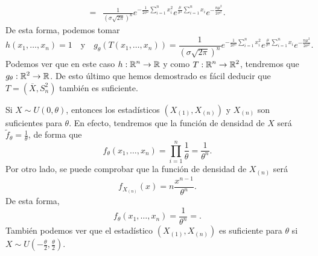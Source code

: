 \begin{eg}[Normal]
\[\begin{split}
	= & \frac{1}{\left(\sigma\sqrt{2\pi }\right)^{n}} e^{-\frac{1}{2\sigma^{2}}\sum^{n}_{i=1}x_{i}^{2}}e^{\frac{\mu}{\sigma^{2}}\sum^{n}_{i=1}x_{i}}e^{-\frac{n\mu^{2}}{2\sigma^{2}}}.
\end{split}
\]
De esta forma, podemos tomar
\[h\left(x_{1}, \ldots, x_{n}\right)=1 \quad \text{y} \quad g_{\theta}\left(T\left(x_{1}, \ldots, x_{n}\right)\right)=\frac{1}{\left(\sigma\sqrt{2\pi }\right)^{n}} e^{-\frac{1}{2\sigma^{2}}\sum^{n}_{i=1}x_{i}^{2}}e^{\frac{\mu}{\sigma^{2}}\sum^{n}_{i=1}x_{i}}e^{-\frac{n\mu^{2}}{2\sigma^{2}}} .\]
Podemos ver que en este caso $\displaystyle h : \mathbb{R}^{n} \to \mathbb{R} $ y como $\displaystyle T : \mathbb{R}^{n} \to \mathbb{R}^{2} $, tendremos que $\displaystyle g_{\theta} : \mathbb{R}^{2} \to \mathbb{R} $. De esto último que hemos demostrado es fácil deducir que $\displaystyle T = \left(\overline{X}, S^{2}_{n}\right) $ también es suficiente. 
\end{eg}
\begin{eg}[Uniforme]
	Si $\displaystyle X \sim U\left(0, \theta\right) $, entonces los estadísticos $\displaystyle \left(X_{\left(1\right)}, X_{\left(n\right)}\right) $ y $\displaystyle X_{\left(n\right)} $ son suficientes para $\displaystyle \theta $. En efecto, tendremos que la función de densidad de $\displaystyle X $ será $\displaystyle \tilde{f}_{\theta}=\frac{1}{\theta} $, de forma que
	\[f_{\theta}\left(x_{1}, \ldots, x_{n}\right)=\prod^{n}_{i=1}\frac{1}{\theta}=\frac{1}{\theta^{n}} .\]
Por otro lado, se puede comprobar que la función de densidad de $\displaystyle X_{\left(n\right)} $ será
\[f_{X_{\left(n\right)}}\left(x\right)=n\frac{x^{n-1}}{\theta^{n}} .\]
De esta forma, 
\[f_{\theta}\left(x_{1}, \ldots, x_{n}\right)=\frac{1}{\theta^{n}}= .\]
También podemos ver que el estadístico $\displaystyle \left(X_{\left(1\right)}, X_{\left(n\right)}\right) $ es suficiente para $\displaystyle \theta $ si $\displaystyle X \sim U\left(-\frac{\theta}{2}, \frac{\theta}{2}\right) $. 
\end{eg}

